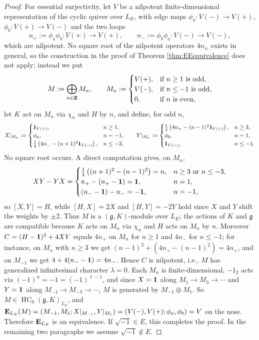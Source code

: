 \documentclass[a4paper,12pt,reqno]{amsart}
\newcommand{\ZZ}{{\rm\bf Z}}
\newcommand{\EE}{{\rm\bf E}}
\DeclareMathOperator{\HC}{\mathrm{HC}}
\theoremstyle{plain}
\theoremstyle{remark}
\begin{document}
\begin{proof}
    For essential surjectivity, let $V$ be a nilpotent finite-dimensional representation of the cyclic quiver over $L_E$, with edge maps $\phi_a\colon V(-)\to V(+)$, $\phi_b\colon V(+)\to V(-)$ and the two loops
    \[
      n_+:=\phi_a\phi_b\colon V(+)\to V(+),\qquad n_-:=\phi_b\phi_a\colon V(-)\to V(-),
    \]
    which are nilpotent. No square root of the nilpotent operators $4n_\pm$ exists in general, so the construction in the proof of Theorem \ref{thm:EEequivalence} does not apply; instead we put
    \[
    M:=\bigoplus_{n\in\ZZ}M_n,\qquad
    M_n:=
    \begin{cases}
      V(+), & \text{if } n\geq1 \text{ is odd},\\
      V(-), & \text{if } n\leq-1 \text{ is odd},\\
      0, & \text{if } n \text{ is even},
    \end{cases}
    \]
    let $K$ act on $M_n$ via $\chi_n$ and $H$ by $n$, and define, for odd $n$,
    \[
    X|_{M_n}:=
    \begin{cases}
      {\bf1}_{V(+)}, & n\geq1,\\
      \phi_a, & n=-1,\\
      \frac14\left(4n_--(n+1)^2{\bf1}_{V(-)}\right), & n\leq-3,
    \end{cases}
    \qquad
    Y|_{M_n}:=
    \begin{cases}
      \frac14\left(4n_+-(n-1)^2{\bf1}_{V(+)}\right), & n\geq3,\\
      \phi_b, & n=1,\\
      {\bf1}_{V(-)}, & n\leq-1.
    \end{cases}
    \]
    No square root occurs. A direct computation gives, on $M_n$,
    \[
    XY-YX=
    \begin{cases}
      \frac14\left((n+1)^2-(n-1)^2\right)=n, & n\geq3 \text{ or } n\leq-3,\\
      n_+-(n_+-{\bf1})={\bf1}, & n=1,\\
      (n_--{\bf1})-n_-=-{\bf1}, & n=-1,
    \end{cases}
    \]
    so $[X,Y]=H$, while $[H,X]=2X$ and $[H,Y]=-2Y$ hold since $X$ and $Y$ shift the weights by $\pm2$. Thus $M$ is a $(\mathfrak{g},K)$-module over $L_E$; the actions of $K$ and $\mathfrak{g}$ are compatible because $K$ acts on $M_n$ via $\chi_n$ and $H$ acts on $M_n$ by $n$. Moreover $C=(H-{\bf1})^2+4XY$ equals $4n_+$ on $M_n$ for $n\geq1$ and $4n_-$ for $n\leq-1$; for instance, on $M_n$ with $n\geq3$ we get $(n-1)^2+(4n_+-(n-1)^2)=4n_+$, and on $M_{-1}$ we get $4+4(n_--{\bf1})=4n_-$. Hence $C$ is nilpotent, i.e., $M$ has generalized infinitesimal character $\lambda=0$. Each $M_n$ is finite-dimensional, $-1_2$ acts via $(-1)^n=-1=(-1)^{\ell-1}$, and since $X={\bf1}$ along $M_1\to M_3\to\cdots$ and $Y={\bf1}$ along $M_{-1}\to M_{-3}\to\cdots$, $M$ is generated by $M_{-1}\oplus M_1$. So $M\in\HC_0(\mathfrak{g},K)_{L_E}$, and $\EE_{L_E}(M)=(M_{-1},M_1;X|_{M_{-1}},Y|_{M_1})=(V(-),V(+);\phi_a,\phi_b)=V$ on the nose. Therefore $\EE_{L_E}$ is an equivalence. If $\sqrt{-1}\in E$, this completes the proof. In the remaining two paragraphs we assume $\sqrt{-1}\not\in E$.


\end{proof}
\end{document}
